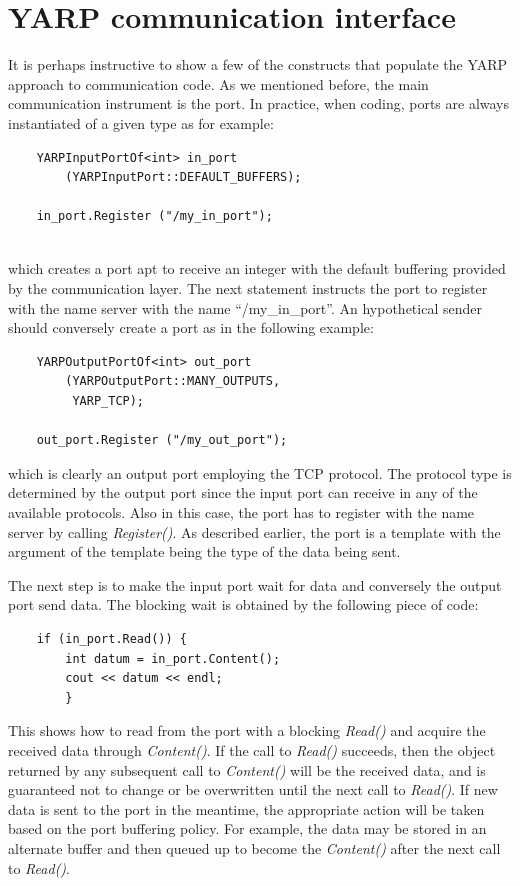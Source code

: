 \section{YARP communication interface}
It is perhaps instructive to show a few of the constructs that populate the YARP approach
to communication code. As we mentioned before, the main communication instrument is the 
port. In practice, when coding, ports are always instantiated of a given type as for 
example:

\begin{verbatim}
    YARPInputPortOf<int> in_port
        (YARPInputPort::DEFAULT_BUFFERS);

    in_port.Register ("/my_in_port");
    
\end{verbatim}

\noindent which creates a port apt to receive an integer with the default buffering
provided by the communication layer. The next statement 
instructs the port to register with the name server with the name ``/my\_in\_port''. An 
hypothetical sender should conversely create a port as in the following example:

\begin{verbatim}
    YARPOutputPortOf<int> out_port
        (YARPOutputPort::MANY_OUTPUTS, 
         YARP_TCP);

    out_port.Register ("/my_out_port");

\end{verbatim}

\noindent which is clearly an output port employing the TCP protocol. The protocol type
is determined by the output port since the input port can receive in any of the available
protocols. Also in this case, the port has to register with the name server by calling 
{\em Register()}. As described earlier, the port is a template with the argument of the
template being the type of the data being sent.

The next step is to make the input port wait for data and conversely the output port send
data. The blocking wait is obtained by the following piece of code:

\begin{verbatim}
    if (in_port.Read()) {
        int datum = in_port.Content();
        cout << datum << endl;
		}

\end{verbatim}

\noindent 
This shows how to read from the port with a blocking {\em Read()} and
acquire the received data through {\em Content()}. If the call to {\em
Read()} succeeds, then the object returned by any subsequent call to
{\em Content()} will be the received data, and is guaranteed not to
change or be overwritten until the next call to {\em Read()}.
If new data is sent to the port in the meantime, the appropriate
action will be taken based on the port buffering policy.  For example,
the data may be stored in an alternate buffer and then queued up to 
become the {\em Content()} after the next call to {\em Read()}.

